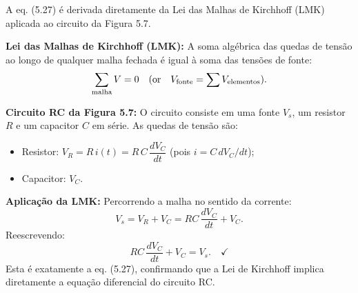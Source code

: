 A eq. (5.27) é derivada diretamente da Lei das Malhas de Kirchhoff (LMK) aplicada ao circuito da Figura 5.7.

\textbf{Lei das Malhas de Kirchhoff (LMK):}
A soma algébrica das quedas de tensão ao longo de qualquer malha fechada é igual à soma das tensões de fonte:
\[
\sum_{\rm malha} V = 0 \quad\text{(or}\quad V_{\rm fonte} = \sum V_{\rm elementos}).
\]

\textbf{Circuito RC da Figura 5.7:}
O circuito consiste em uma fonte $V_s$, um resistor $R$ e um capacitor $C$ em série. As quedas de tensão são:
\begin{itemize}
\item Resistor: $V_R = R\,i(t) = R\,C\,\dfrac{dV_C}{dt}$ (pois $i = C\,dV_C/dt$);
\item Capacitor: $V_C$.
\end{itemize}

\textbf{Aplicação da LMK:}
Percorrendo a malha no sentido da corrente:
\[
V_s = V_R + V_C = RC\,\frac{dV_C}{dt} + V_C.
\]
Reescrevendo:
\[
RC\,\frac{dV_C}{dt} + V_C = V_s.\quad\checkmark
\]
Esta é exatamente a eq. (5.27), confirmando que a Lei de Kirchhoff implica diretamente a equação diferencial do circuito RC. 